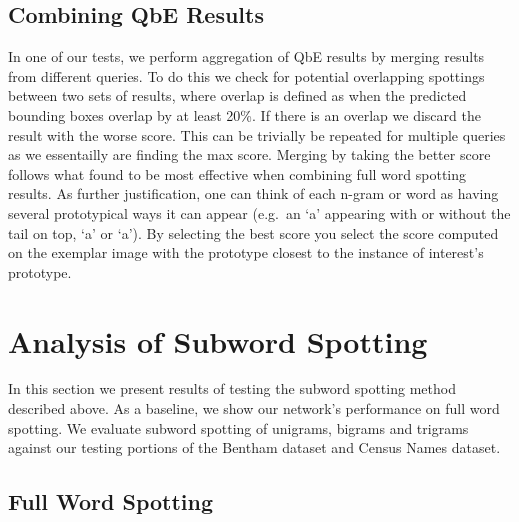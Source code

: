 \documentclass[ms,electronic,twosidetoc,letterpaper,chaptercenter,parttop,lof,lot]{byumsphd}
\begin{document}

\subsection{Combining QbE Results}\label{combine}

In one of our tests, we perform aggregation of QbE results by merging results from different queries. To do this we check for potential overlapping spottings between two sets of results, where overlap is defined as when the predicted bounding boxes overlap by at least 20\%. If there is an overlap we discard the result with the worse score. This can be trivially be repeated for multiple queries as we essentailly are finding the max score. Merging by taking the better score follows what \cite{Zagoris2015} found to be most effective when combining full word spotting results. As further justification, one can think of each n-gram or word as having several prototypical ways it can appear (e.g.~an `a' appearing with or without the tail on top, `\textsf{a}' or `{\selectfont\footnotesize a}'). By selecting the best score you select the score computed on the exemplar image with the prototype closest to the instance of interest's prototype.



\section{Analysis of Subword Spotting}

In this section we present results of testing the subword spotting method described above.
As a baseline, we show our network's performance on full word spotting. We evaluate subword spotting of unigrams, bigrams and trigrams against our testing portions of the Bentham dataset and Census Names dataset. 

\subsection{Full Word Spotting}
\end{document}
